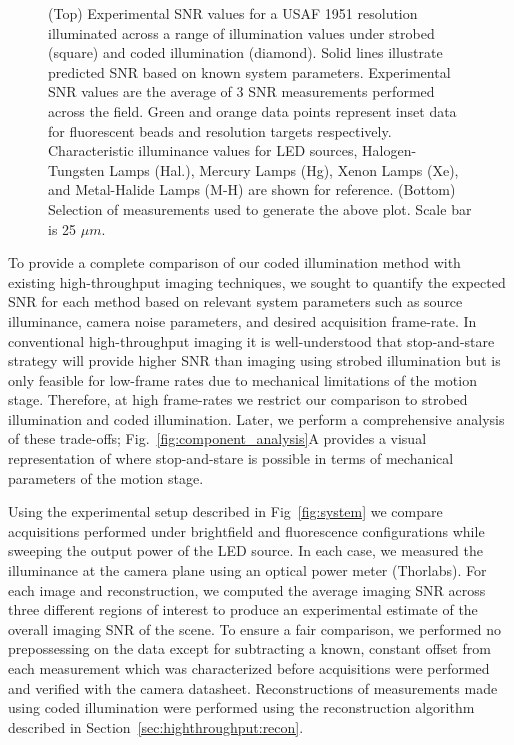 \begin{figure}
\begin{minipage}[c]{0.5\textwidth}
  \end{minipage}\hfill
  \begin{minipage}[c]{0.45\textwidth}
    \caption{
(Top) Experimental SNR values for a USAF 1951 resolution illuminated across a range of illumination values under strobed (square) and coded illumination (diamond). Solid lines illustrate predicted SNR based on known system parameters. Experimental SNR values are the average of 3 SNR measurements performed across the field. Green and orange data points represent inset data for fluorescent beads and resolution targets respectively. Characteristic illuminance values for LED sources, Halogen-Tungsten Lamps (Hal.), Mercury Lamps (Hg), Xenon Lamps (Xe), and Metal-Halide Lamps (M-H) are shown for reference. (Bottom) Selection of measurements used to generate the above plot. Scale bar is 25 $\mu m$.
    } \label{fig:experimental_comparison}
  \end{minipage}
\end{figure}

To provide a complete comparison of our coded illumination method with existing high-throughput imaging techniques, we sought to quantify the expected SNR for each method based on relevant system parameters such as source illuminance, camera noise parameters, and desired acquisition frame-rate. In conventional high-throughput imaging it is well-understood that stop-and-stare strategy will provide higher SNR than imaging using strobed illumination but is only feasible for low-frame rates due to mechanical limitations of the motion stage.
Therefore, at high frame-rates we restrict our comparison to strobed illumination and coded illumination. Later, we perform a comprehensive analysis of these trade-offs; Fig.~\ref{fig:component_analysis}A provides a visual representation of where stop-and-stare is possible in terms of mechanical parameters of the motion stage.

Using the experimental setup described in Fig~\ref{fig:system} we compare acquisitions performed under brightfield and fluorescence configurations while sweeping the output power of the LED source. In each case, we measured the illuminance at the camera plane using an optical power meter (Thorlabs). For each image and reconstruction, we computed the average imaging SNR across three different regions of interest to produce an experimental estimate of the overall imaging SNR of the scene. To ensure a fair comparison, we performed no prepossessing on the data except for subtracting a known, constant offset from each measurement which was characterized before acquisitions were performed and verified with the camera datasheet. Reconstructions of measurements made using coded illumination were performed using the reconstruction algorithm described in Section~\ref{sec:highthroughput:recon}.

